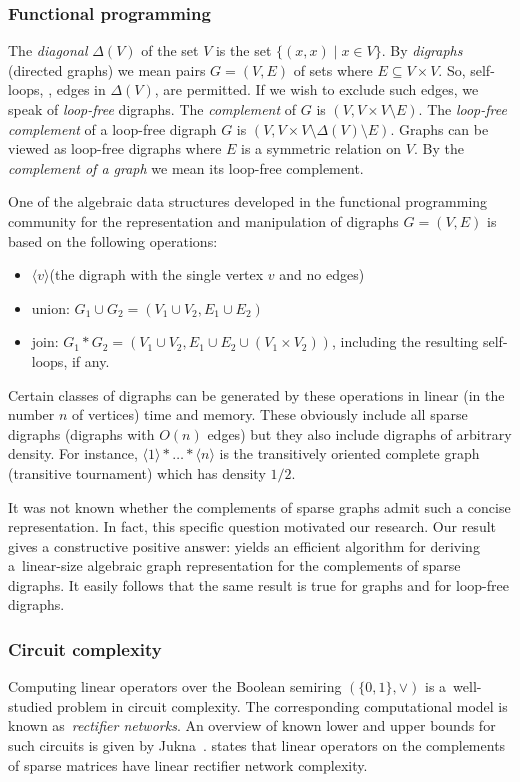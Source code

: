 \documentclass{toc}
\begin{document}
\subsubsection{Functional programming}

%
%
The \emph{diagonal} $\Delta(V)$ of the set $V$ is the set $\{(x,x)\mid x\in V\}$.
By \emph{digraphs} (directed graphs) we mean pairs $G=(V,E)$ of sets where
$E\subseteq V\times V$.  So, self-loops, \ie, edges in $\Delta(V)$, are
permitted.  If we wish to exclude such edges, we speak of \emph{loop-free}
digraphs.  The \emph{complement} of $G$ is $(V, V\times V\setminus E)$.
The \emph{loop-free complement} of a loop-free digraph $G$ is
$(V, V\times V \setminus \Delta(V)\setminus E)$.  Graphs can be viewed
as loop-free digraphs where $E$ is a symmetric relation on $V$.  By the
\emph{complement of a graph} we mean its loop-free complement.

One of the algebraic data structures developed in the functional programming
community for the representation and manipulation of digraphs
$G=(V,E)$ is based on the following operations:
\begin{itemize}
\item $\langle v\rangle$\quad (the digraph with the single vertex $v$ and no edges)
\item union: $G_1 \cup G_2 = (V_1 \cup V_2, E_1 \cup E_2)$
\item join: $G_1 \ast G_2 = (V_1 \cup V_2, E_1 \cup E_2 \cup (V_1 \times V_2))$, including
  the resulting self-loops, if any.
\end{itemize}
Certain classes of digraphs can be generated by these operations
in linear (in the number $n$ of vertices) time and memory.  These obviously
include all sparse digraphs (digraphs with $O(n)$ edges) but they also include
digraphs of arbitrary density.  For instance,
$\langle 1\rangle \ast \dots \ast \langle n\rangle$
is the transitively oriented complete graph
(transitive tournament) which has density $1/2$.  %
%

It was not known whether the
complements of sparse graphs admit such a concise representation.
%
%
%
%
%
In fact, this specific question motivated our research.  %
Our result gives a constructive positive answer:
 yields an
efficient algorithm for deriving a~linear-size algebraic graph representation
for the complements of sparse digraphs.
%
%
It easily follows that the same result is true for graphs and for
loop-free digraphs.  %

\subsubsection{Circuit complexity}  Computing linear operators over
the Boolean semiring $(\{0,1\}, \lor)$ is a~well-studied problem
in circuit complexity. The corresponding computational model is known
as~\emph{rectifier networks}. An overview of known lower and upper bounds for
such circuits is given by Jukna~\cite[Section~13.6]{DBLP:books/daglib/0028687}.
 states that linear operators on
the %
complements of
sparse matrices have linear rectifier network complexity.
\end{document}
